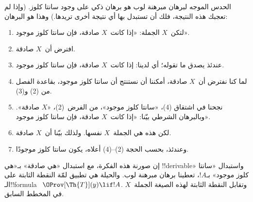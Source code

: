\documentclass[../../../include/open-logic-section]{subfiles}
\begin{document}
\begin{explain}
الحدس الموجه لبرهان مبرهنة لوب هو برهان ذكي على وجود سانتا كلوز. (وإذا
لم تعجبك هذه النتيجة، فلك أن تستبدل بها أي نتيجة أخرى تريدها.) وهذا هو
البرهان:
\begin{enumerate}
\item لتكن~$X$ الجملة: «إذا كانت~$X$ صادقة، فإن سانتا كلوز موجود».
\item افترض أن~$X$ صادقة.
\item عندئذ يصدق ما تقوله؛ أي لدينا: إذا كانت~$X$ صادقة، فإن سانتا
  كلوز موجود.
\item لما كنا نفترض أن~$X$ صادقة، أمكننا أن نستنتج أن سانتا كلوز
  موجود، بقاعدة الفصل من (2) و(3).
\item نجحنا في اشتقاق (4)، «سانتا كلوز موجود»، من الفرض~(2)، «$X$
  صادقة». وبالبرهان الشرطي بيّنا: «إذا كانت~$X$ صادقة، فإن سانتا كلوز
  موجود».
\item لكن هذه هي الجملة~$X$ نفسها. ولذلك بيّنا أن~$X$ صادقة.
\item وعندئذ، بحسب الحجة (2)--(4) أعلاه، يكون سانتا كلوز موجودًا.
\end{enumerate}
إن صورنة هذه الفكرة، مع استبدال «هي صادقة» بـ«هي !!{derivable}»
واستبدال «سانتا كلوز موجود» بـ$!A$، تعطينا برهان مبرهنة لوب. والحيلة
هي تطبيق لمّة النقطة الثابتة على الـ!!{formula}~
$\OProv[\Th{T}](y) \lif !A$. وتقابل النقطة الثابتة لهذه الصيغة
الجملة~$X$ في المخطط السابق.
\end{explain}
\end{document}
